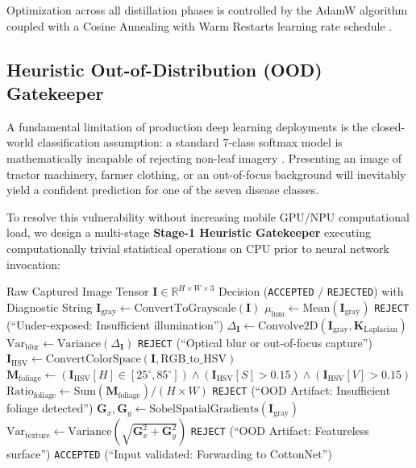 \documentclass[journal,10pt,twocolumn]{IEEEtran}
\begin{document}
Optimization across all distillation phases is controlled by the AdamW algorithm \cite{loshchilov2018decoupled} coupled with a Cosine Annealing with Warm Restarts learning rate schedule \cite{loshchilov2016sgdr}.

\subsection{Heuristic Out-of-Distribution (OOD) Gatekeeper}
A fundamental limitation of production deep learning deployments is the closed-world classification assumption: a standard 7-class softmax model is mathematically incapable of rejecting non-leaf imagery \cite{hendrycks2016baseline}. Presenting an image of tractor machinery, farmer clothing, or an out-of-focus background will inevitably yield a confident prediction for one of the seven disease classes.

To resolve this vulnerability without increasing mobile GPU/NPU computational load, we design a multi-stage \textbf{Stage-1 Heuristic Gatekeeper} executing computationally trivial statistical operations on CPU prior to neural network invocation:

\begin{algorithm}[H]
\caption{Stage-1 Heuristic Quality and OOD Gatekeeper}
\begin{algorithmic}[1]
\REQUIRE Raw Captured Image Tensor $\mathbf{I} \in \mathbb{R}^{H \times W \times 3}$
\ENSURE Decision (\texttt{ACCEPTED} / \texttt{REJECTED}) with Diagnostic String
\STATE $\mathbf{I}_{\text{gray}} \leftarrow \text{ConvertToGrayscale}(\mathbf{I})$
\STATE $\mu_{\text{lum}} \leftarrow \text{Mean}(\mathbf{I}_{\text{gray}})$
    \RETURN \texttt{REJECT} (``Under-exposed: Insufficient illumination'')
\ENDIF
\STATE $\Delta_{\mathbf{I}} \leftarrow \text{Convolve2D}(\mathbf{I}_{\text{gray}}, \mathbf{K}_{\text{Laplacian}})$
\STATE $\text{Var}_{\text{blur}} \leftarrow \text{Variance}(\Delta_{\mathbf{I}})$
    \RETURN \texttt{REJECT} (``Optical blur or out-of-focus capture'')
\ENDIF
\STATE $\mathbf{I}_{\text{HSV}} \leftarrow \text{ConvertColorSpace}(\mathbf{I}, \text{RGB\_to\_HSV})$
\STATE $\mathbf{M}_{\text{foliage}} \leftarrow (\mathbf{I}_{\text{HSV}}[H] \in [25^\circ, 85^\circ]) \land (\mathbf{I}_{\text{HSV}}[S] > 0.15) \land (\mathbf{I}_{\text{HSV}}[V] > 0.15)$
\STATE $\text{Ratio}_{\text{foliage}} \leftarrow \text{Sum}(\mathbf{M}_{\text{foliage}}) / (H \times W)$
    \RETURN \texttt{REJECT} (``OOD Artifact: Insufficient foliage detected'')
\ENDIF
\STATE $\mathbf{G}_x, \mathbf{G}_y \leftarrow \text{SobelSpatialGradients}(\mathbf{I}_{\text{gray}})$
\STATE $\text{Var}_{\text{texture}} \leftarrow \text{Variance}\left(\sqrt{\mathbf{G}_x^2 + \mathbf{G}_y^2}\right)$
    \RETURN \texttt{REJECT} (``OOD Artifact: Featureless surface'')
\ENDIF
\RETURN \texttt{ACCEPTED} (``Input validated: Forwarding to CottonNet'')
\end{algorithmic}
\end{algorithm}
\end{document}
